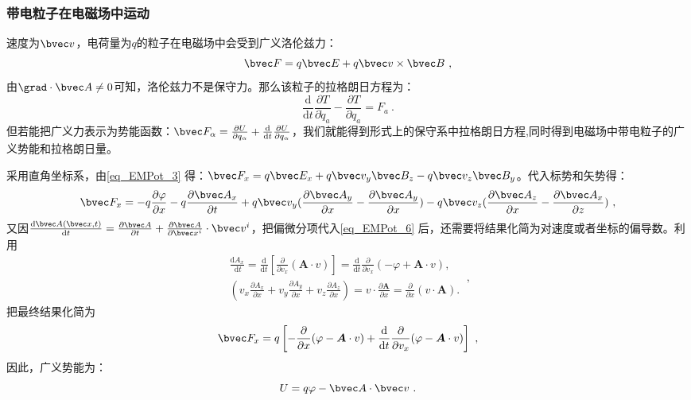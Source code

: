 \subsubsection{带电粒子在电磁场中运动}
速度为$\bvec v$，电荷量为$q$的粒子在电磁场中会受到广义洛伦兹力：
\begin{equation}\label{eq_EMPot_3}
\bvec F=q\bvec E+q\bvec v \times \bvec B
~,\end{equation}
由$\grad \cdot \bvec A\neq 0$可知，洛伦兹力不是保守力。那么该粒子的拉格朗日方程为：
\begin{equation}
\frac{\mathrm{d}}{\mathrm{d} t} \frac{\partial T}{\partial \dot{q}_a}-\frac{\partial T}{\partial q_a}=F_a~.
\end{equation}
但若能把广义力表示为势能函数：$\bvec F_{\alpha}=\frac{\partial U}{\partial q_{\alpha}}+\frac{\mathrm{d}}{\mathrm{d}t}\frac{\partial U}{\partial q_{\alpha}}$，我们就能得到形式上的保守系中拉格朗日方程,同时得到电磁场中带电粒子的广义势能和拉格朗日量。

采用直角坐标系，由\autoref{eq_EMPot_3} 得：$\bvec F_x=q\bvec E_x+q\bvec v_y\bvec B_z-q\bvec v_z\bvec B_y$。代入标势和矢势得：
\begin{equation}\label{eq_EMPot_6}
\bvec F_x=-q\frac{\partial \varphi}{\partial x}-q\frac{\partial \bvec A_x}{\partial t}+q\bvec v_y(\frac{\partial \bvec A_y}{\partial x}-\frac{\partial \bvec A_y}{\partial x})-q\bvec v_z(\frac{\partial \bvec A_z}{\partial x}-\frac{\partial \bvec A_x}{\partial z})~,
\end{equation}
又因$\frac{\mathrm{d}\bvec A(\bvec x,t)}{\mathrm{d}t}=\frac{\partial \bvec A}{\partial t}+\frac{\partial \bvec A}{\partial \bvec x^i}\cdot \bvec v^i$，把偏微分项代入\autoref{eq_EMPot_6} 后，还需要将结果化简为对速度或者坐标的偏导数。利用
\begin{equation}
\begin{array}{c}
\frac{\mathrm{d} A_x}{\mathrm{~d} t}=\frac{\mathrm{d}}{\mathrm{d} t}\left[\frac{\partial}{\partial v_x}(\boldsymbol{A} \cdot v)\right]=\frac{\mathrm{d}}{\mathrm{d} t} \frac{\partial}{\partial v_x}(-\varphi+\boldsymbol{A} \cdot v), \\
\left(v_x \frac{\partial A_x}{\partial x}+v_y \frac{\partial A_y}{\partial x}+v_z \frac{\partial A_z}{\partial x}\right)=v \cdot \frac{\partial \boldsymbol{A}}{\partial x}=\frac{\partial}{\partial x}(v \cdot \boldsymbol{A}) .
\end{array}~,
\end{equation}
把最终结果化简为
\begin{equation}
\bvec F_x=q\left[-\frac{\partial}{\partial x}(\varphi-\boldsymbol{A} \cdot v)+\frac{\mathrm{d}}{\mathrm{d} t} \frac{\partial}{\partial v_x}(\varphi-\boldsymbol{A} \cdot v)\right]~,
\end{equation}
因此，广义势能为：
\begin{equation}
U=q\varphi -\bvec A\cdot \bvec v~.
\end{equation}